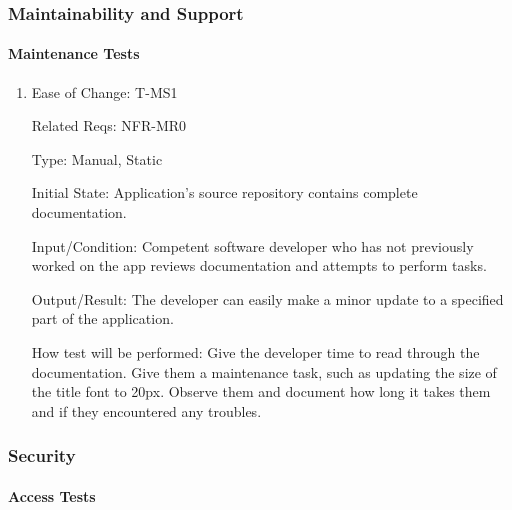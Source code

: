 \documentclass[12pt, titlepage]{article}
\begin{document}
\subsubsection{Maintainability and Support}
		
\paragraph{Maintenance Tests}

\begin{enumerate}

\item{Ease of Change: T-MS1\\}

Related Reqs: NFR-MR0

Type: Manual, Static
					
Initial State: Application's source repository contains complete documentation.
					
Input/Condition: Competent software developer who has not previously worked on the app reviews documentation and attempts to perform tasks.
					
Output/Result: The developer can easily make a minor update to a specified part of the application.
					
How test will be performed: Give the developer time to read through the documentation. Give them a maintenance task, such as updating the size of the title font to 20px. Observe them and document how long it takes them and if they encountered any troubles.
\end{enumerate}

\subsubsection{Security}
		
\paragraph{Access Tests}
\end{document}
